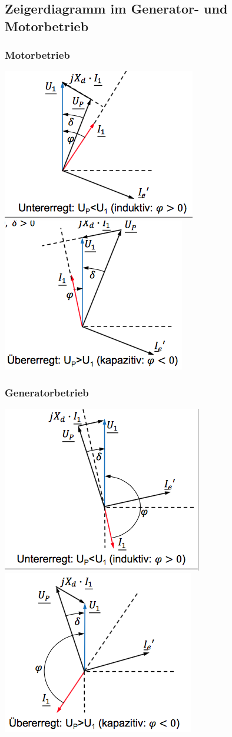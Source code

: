 \subsection{Zeigerdiagramm im Generator- und Motorbetrieb}
\begin{minipage}{0.5 \linewidth}
\subsubsection{Motorbetrieb}
\includegraphics[width = 0.5 \linewidth]{./Pics/VL910/motuntererregt}
\includegraphics[width = 0.5 \linewidth]{./Pics/VL910/motuebererregt}
\end{minipage}
\begin{minipage}{0.5 \linewidth}
\subsubsection{Generatorbetrieb}
\includegraphics[width = 0.5 \linewidth]{./Pics/VL910/genuntererregt}
\includegraphics[width = 0.5 \linewidth]{./Pics/VL910/genuebererregt}
\end{minipage}

